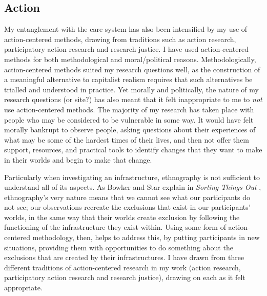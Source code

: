 
\subsection{Action}
\label{3-action}

My entanglement with the care system has also been intensified by my use of action-centered methods, drawing from traditions such as action research, participatory action research and research justice. I have used action-centered methods for both methodological and moral/political reasons. Methodologically, action-centered methods suited my research questions well, as the construction of a meaningful alternative to capitalist realism requires that such alternatives be trialled and understood in practice. Yet morally and politically, the nature of my research questions (or site?) has also meant that it felt inappropriate to me to \textit{not} use action-centered methods. The majority of my research has taken place with people who may be considered to be vulnerable in some way. It would have felt morally bankrupt to observe people, asking questions about their experiences of what may be some of the hardest times of their lives, and then not offer them support, resources, and practical tools to identify changes that they want to make in their worlds and begin to make that change.

Particularly when investigating an infrastructure, ethnography is not sufficient to understand all of its aspects. As Bowker and Star explain in \textit{Sorting Things Out} \citep{bowker_sorting_1999}, ethnography's very nature means that we cannot see what our participants do not see; our observations recreate the exclusions that exist in our participants' worlds, in the same way that their worlds create exclusion by following the functioning of the infrastructure they exist within. Using some form of action-centered methodology, then, helps to address this, by putting participants in new situations, providing them with opportunities to do something about the exclusions that are created by their infrastructures. I have drawn from three different traditions of action-centered research in my work (action research, participatory action research and research justice), drawing on each as it felt appropriate. 

